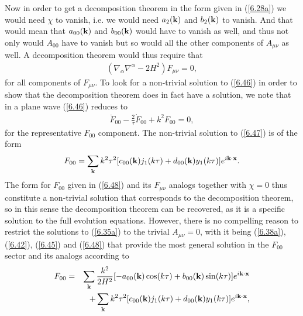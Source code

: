 Now in order to get a decomposition theorem in the form given in (\ref{6.28a}) we would need $\chi$ to vanish, i.e. we would need $a_2({\bf k})$ and $b_2({\bf k})$ to vanish. And that would mean that $a_{00}({\bf k})$ and $b_{00}({\bf k})$ would have to vanish as well, and thus not only would $A_{00}$ have to vanish but so would all the other components of $A_{\mu\nu}$ as well. A decomposition theorem would thus require that
%
\begin{eqnarray}
(\nabla_{\alpha}\nabla^{\alpha}-2H^2)F_{\mu\nu}=0,
\label{6.46}
\end{eqnarray}
%
for all components of $F_{\mu\nu}$. To look for a non-trivial solution to (\ref{6.46}) in order to show that the decomposition theorem does in fact have a solution, we note that in a plane wave (\ref{6.46}) reduces to 
%
\begin{eqnarray}
\ddot{F}_{00}-\frac{2}{\tau}\dot{F}_{00}+k^2F_{00}=0,
\label{6.47}
\end{eqnarray}
%
for the representative $F_{00}$ component. The non-trivial solution to (\ref{6.47}) is of the form 
%
\begin{eqnarray}
F_{00}=\sum_{\bf k} k^2\tau^2[c_{00}({\bf k})j_1(k\tau)+d_{00} ({\bf k})y_1(k\tau)]e^{i{\bf k}\cdot {\bf x}}.
\label{6.48}
\end{eqnarray}
% 
The form for $F_{00}$ given in (\ref{6.48}) and its $F_{\mu\nu}$ analogs together with $\chi=0$ thus constitute a non-trivial solution that corresponds to the decomposition theorem, so in this sense the decomposition theorem can be recovered, as it is a specific solution to the full evolution equations. However, there is no compelling reason to restrict the solutions to (\ref{6.35a}) to the trivial $A_{\mu\nu}=0$, with it being (\ref{6.38a}), (\ref{6.42}), (\ref{6.45}) and (\ref{6.48}) that provide the most general solution in the $F_{00}$ sector and its analogs according to 
%
\begin{eqnarray}
F_{00}&=&\sum_{\bf k}\frac{k^2}{2H^2} [-a_{00}({\bf k})\cos(k\tau)+b_{00} ({\bf k})\sin(k\tau)]e^{i{\bf k}\cdot {\bf x}}
\nonumber\\
&&+\sum_{\bf k} k^2\tau^2[c_{00}({\bf k})j_1(k\tau)+d_{00} ({\bf k})y_1(k\tau)]e^{i{\bf k}\cdot {\bf x}},
\label{6.49}
\end{eqnarray}
% 
